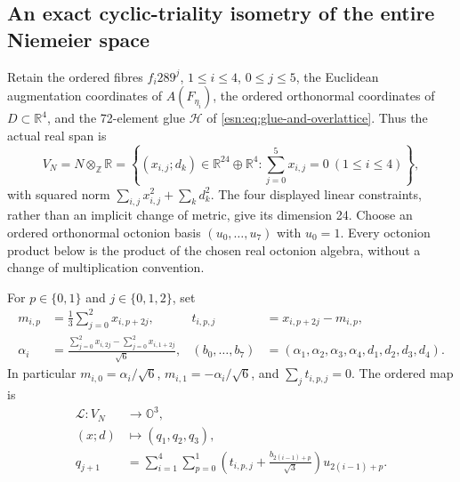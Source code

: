 
\subsection{An exact cyclic-triality isometry of the entire Niemeier space}
\label{n24:sec:cyclic-isometry}

Retain the ordered fibres
\(f_i289^j\), \(1\leq i\leq4\), \(0\leq j\leq5\),
the Euclidean augmentation coordinates of \(A(F_{\eta_i})\), the
ordered orthonormal coordinates of \(D\subset\mathbb R^4\), and the
72-element glue \(\mathcal H\) of
\eqref{esn:eq:glue-and-overlattice}.  Thus the actual real span is
\[
 V_N=N\otimes_{\mathbb Z}\mathbb R
 =\left\{(x_{i,j};d_k)\in\mathbb R^{24}\oplus\mathbb R^4:
               \sum_{j=0}^5x_{i,j}=0\ (1\leq i\leq4)\right\},
\]
with squared norm \(\sum_{i,j}x_{i,j}^2+\sum_kd_k^2\).
The four displayed linear constraints, rather than an implicit change of
metric, give its dimension 24.  Choose an ordered orthonormal octonion
basis \((u_0,\ldots,u_7)\) with \(u_0=1\).  Every octonion product
below is the product of the chosen real octonion algebra, without a
change of multiplication convention.

For \(p\in\{0,1\}\) and \(j\in\{0,1,2\}\), set
\begin{align}
 m_{i,p}&=\frac13\sum_{j=0}^2x_{i,p+2j},&
 t_{i,p,j}&=x_{i,p+2j}-m_{i,p},\label{n24:eq:triplets}\\
 \alpha_i&=\frac{\sum_{j=0}^2x_{i,2j}
                    -\sum_{j=0}^2x_{i,1+2j}}{\sqrt6},&
 (b_0,\ldots,b_7)&=(\alpha_1,\alpha_2,\alpha_3,\alpha_4,
                           d_1,d_2,d_3,d_4).
 \label{n24:eq:fixed-coordinates}
\end{align}
In particular \(m_{i,0}=\alpha_i/\sqrt6\),
\(m_{i,1}=-\alpha_i/\sqrt6\), and
\(\sum_jt_{i,p,j}=0\).  The ordered map is
\begin{equation}
 \begin{split}
 \mathcal L:V_N&\longrightarrow\mathbb O^3,\\
 (x;d)&\longmapsto(q_1,q_2,q_3),\\
 q_{j+1}&=\sum_{i=1}^4\sum_{p=0}^1
       \left(t_{i,p,j}+\frac{b_{2(i-1)+p}}{\sqrt3}\right)
                                          u_{2(i-1)+p}.
 \end{split}
 \label{n24:eq:full-isometry}
\end{equation}

